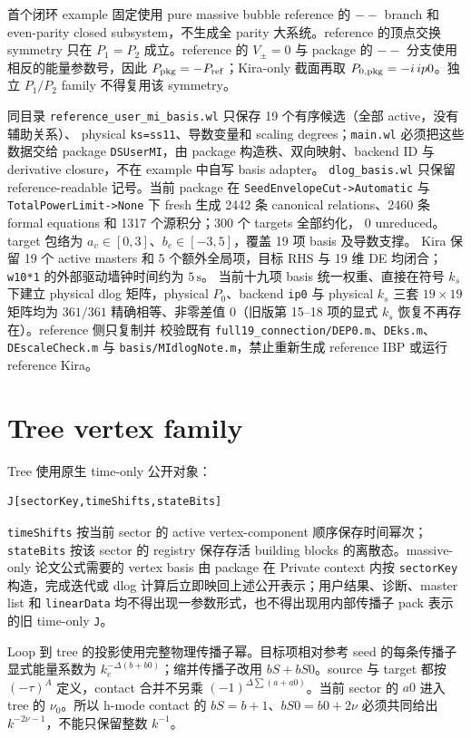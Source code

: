 ﻿\documentclass[a4paper,11pt]{article}
\begin{document}
首个闭环 example 固定使用 pure massive bubble reference 的 $--$ branch 和 even-parity closed subsystem，不生成全 parity 大系统。reference 的顶点交换 symmetry 只在 $P_1=P_2$ 成立。reference 的 $V_{\pm}=0$ 与 package 的 $--$ 分支使用相反的能量参数号，因此 $P_{\rm pkg}=-P_{\rm ref}$；Kira-only 截面再取 $P_{0,\rm pkg}=-i\,ip0$。独立 $P_1/P_2$ family 不得复用该 symmetry。

同目录 \texttt{reference\_user\_mi\_basis.wl} 只保存 19 个有序候选（全部 active，没有辅助关系）、
physical \texttt{ks=ss11}、导数变量和 scaling degrees；\texttt{main.wl} 必须把这些数据交给 package \texttt{DSUserMI}，由 package 构造秩、双向映射、backend ID 与 derivative closure，不在 example 中自写 basis adapter。
\texttt{dlog\_basis.wl} 只保留 reference-readable 记号。当前 package 在
\texttt{SeedEnvelopeCut->Automatic} 与 \texttt{TotalPowerLimit->None} 下 fresh 生成
2442 条 canonical relations、2460 条 formal equations 和 1317 个源积分；300 个 targets 全部约化，
0 unreduced。target 包络为 $a_v\in[0,3]$、$b_e\in[-3,5]$，覆盖 19 项 basis 及导数支撑。
Kira 保留 19 个 active masters 和 5 个额外全局项，目标 RHS 与 19 维 DE 均闭合；
\texttt{w10*1} 的外部驱动墙钟时间约为 $5\,\mathrm{s}$。
当前十九项 basis 统一权重、直接在符号 $k_s$ 下建立 physical dlog 矩阵，physical $P_0$、backend \texttt{ip0}
与 physical $k_s$ 三套 $19\times19$ 矩阵均为 $361/361$ 精确相等、非零差值 0（旧版第 15--18 项的显式 $k_s$ 恢复不再存在）。reference 侧只复制并
校验既有 \texttt{full19\_connection/DEP0.m}、\texttt{DEks.m}、\texttt{DEscaleCheck.m} 与 \texttt{basis/MIdlogNote.m}，禁止重新生成
reference IBP 或运行 reference Kira。

\section{Tree vertex family}

Tree 使用原生 time-only 公开对象：
\begin{verbatim}
J[sectorKey,timeShifts,stateBits]
\end{verbatim}
\texttt{timeShifts} 按当前 sector 的 active vertex-component 顺序保存时间幂次；\texttt{stateBits} 按该 sector 的 registry 保存存活 building blocks 的离散态。massive-only 论文公式需要的 vertex basis 由 package 在 Private context 内按 \texttt{sectorKey} 构造，完成迭代或 dlog 计算后立即映回上述公开表示；用户结果、诊断、master list 和 \texttt{linearData} 均不得出现一参数形式，也不得出现用内部传播子 pack 表示的旧 time-only \texttt{J}。

Loop 到 tree 的投影使用完整物理传播子幂。目标项相对参考 seed 的每条传播子显式能量系数为 $k_e^{-\Delta(b+b0)}$；缩并传播子改用 $bS+bS0$。source 与 target 都按 $(-\tau)^A$ 定义，contact 合并不另乘 $(-1)^{\Delta\sum(a+a0)}$。当前 sector 的 $a0$ 进入 tree 的 $\nu_0$。所以 h-mode contact 的 $bS=b+1$、$bS0=b0+2\nu$ 必须共同给出 $k^{-2\nu-1}$，不能只保留整数 $k^{-1}$。
\end{document}

